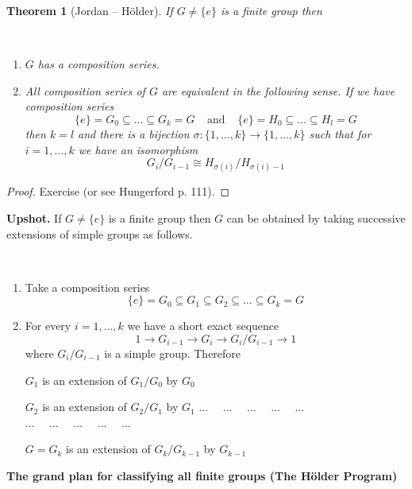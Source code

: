 \documentclass[12pt, letterpaper, oneside]{article}
\theoremstyle{plain}
\newtheorem{theorem}{Theorem}[section]
\theoremstyle{definition}
\newcommand{\lra}{\longrightarrow}
\newcommand{\benu}{\begin{enumerate}}
\newcommand{\eenu}{\end{enumerate}}
\newcommand{\vs}{\vskip 5mm}
\begin{document}
\begin{theorem}[Jordan -- H\"{o}lder]
\label{THM_JORDANHOLDER}
If $G\neq \{e\}$ is a finite group then 

\vskip -11mm


\ 
\benu
\item $G$ has a composition series.
\item All composition series of $G$ are equivalent in the following sense. If 
we have composition series
$$\{e\}= G_{0} \subseteq {\dots} \subseteq G_{k} = G \ \ \ \ \ \text{and} \ \ \ \ \  
\{e\}= H_{0} \subseteq {\dots} \subseteq H_{l} = G$$
then $k=l$ and there is a bijection $\sigma \colon \{1, \dots, k\} \to \{1, \dots, k\}$
such that for  $i=1, \dots, k$ we have an isomorphism 
$$G_{i}/G_{i-1} \cong H_{\sigma(i)}/H_{\sigma(i)-1}$$
\eenu
 
\end{theorem}

\begin{proof}
Exercise (or see Hungerford p. 111).
\end{proof}


\vs\vs

\textbf{Upshot.} If $G\neq \{e\}$ is a finite group then $G$ can be obtained by 
taking successive extensions of simple groups as follows.

\vskip -13mm

\  
\benu 
\item Take a composition series 
$$\{e\} = G_{0} \subseteq G_{1} \subseteq G_{2} \subseteq {\dots}\subseteq G_{k} = G$$
\item For every $i=1, \dots, k$ we have a short exact sequence 
$$1 \lra G_{i-1} \lra G_{i} \lra G_{i}/G_{i-1} \lra 1$$ 
where $G_{i}/G_{i-1}$ is a simple group. Therefore 

$G_{1}$ is an extension of $G_{1}/G_{0}$ by $G_{0}$

\vskip -1mm
$G_{2}$ is an extension of $G_{2}/G_{1}$ by $G_{1}$ \newline
$\dots \ \ \ \ \  \ \dots  \ \ \ \ \ \    \dots \ \ \ \ \ \    \dots \ \ \ \ \ \  \dots$ \newline
$\dots \ \ \ \ \  \ \dots  \ \ \ \ \ \    \dots \ \ \ \ \ \    \dots \ \ \ \ \ \  \dots$

\vskip -1mm
$G= G_{k}$ is an extension of $G_{k}/G_{k-1}$ by $G_{k-1}$ \newline
\eenu



\newpage

\centerline{\textbf{The grand plan for classifying all finite groups (The H\"{o}lder Program)}}
\end{document}
